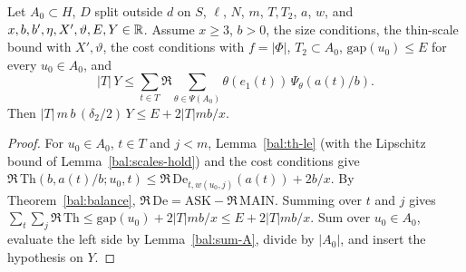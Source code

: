 \begin{lemma}\label{bal:core}
Let $A_0\subset H$, $D$ split outside $d$ on $S$, $\ell$, $N$, $m$, $T,T_2$, $a$, $w$, and $x,b,b',\eta,X',\vartheta,E,Y\in\mathbb{R}$. Assume $x\ge3$, $b>0$, the size conditions, the thin-scale bound with $X',\vartheta$, the cost conditions with $f=|\Phi|$, $T_2\subset A_0$, $\mathrm{gap}(u_0)\le E$ for every $u_0\in A_0$, and
\[|T|\,Y\le\sum_{t\in T}\Re\sum_{\theta\in\Psi(A_0)}\theta(e_1(t))\,\Psi_{\theta}(a(t)/b).\]
Then $|T|\,m\,b\,(\delta_2/2)\,Y\le E+2|T|mb/x$.
\end{lemma}
\begin{proof}
For $u_0\in A_0$, $t\in T$ and $j<m$, Lemma~\ref{bal:th-le} (with the Lipschitz bound of Lemma~\ref{bal:scales-hold}) and the cost conditions give $\Re\,\mathrm{Th}(b,a(t)/b;u_0,t)\le\Re\,\mathrm{De}_{t,w(u_0,j)}(a(t))+2b/x$. By Theorem~\ref{bal:balance}, $\Re\,\mathrm{De}=\mathrm{ASK}-\Re\,\mathrm{MAIN}$. Summing over $t$ and $j$ gives $\sum_t\sum_j\Re\,\mathrm{Th}\le\mathrm{gap}(u_0)+2|T|mb/x\le E+2|T|mb/x$. Sum over $u_0\in A_0$, evaluate the left side by Lemma~\ref{bal:sum-A}, divide by $|A_0|$, and insert the hypothesis on $Y$.
\end{proof}

